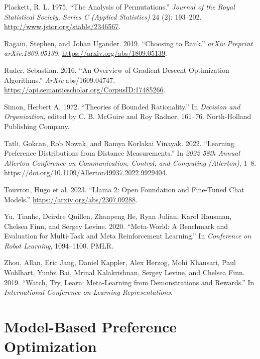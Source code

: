 \documentclass[
  letterpaper,
  numbers=noenddot,
  DIV=11]{scrreprt}
\newlength{\cslhangindent}
\newenvironment{CSLReferences}[2] %
 {\begin{list}{}{%
  \setlength{\itemindent}{0pt}
  \setlength{\leftmargin}{0pt}
  \setlength{\parsep}{0pt}
  \ifodd #1
   \setlength{\leftmargin}{\cslhangindent}
   \setlength{\itemindent}{-1\cslhangindent}
  \fi
  \setlength{\itemsep}{#2\baselineskip}}}
 {\end{list}}
\let\oldchapter\chapter
\def\chapter{%
  \setcounter{sidenote}{1}%
  \oldchapter
}
\theoremstyle{plain}
\theoremstyle{definition}
\theoremstyle{plain}
\theoremstyle{remark}
\begin{document}
\begin{CSLReferences}{1}{0}
Plackett, R. L. 1975. {``The Analysis of Permutations.''} \emph{Journal
of the Royal Statistical Society. Series C (Applied Statistics)} 24 (2):
193--202. \url{http://www.jstor.org/stable/2346567}.

Ragain, Stephen, and Johan Ugander. 2019. {``Choosing to Rank.''}
\emph{arXiv Preprint arXiv:1809.05139}.
\url{https://arxiv.org/abs/1809.05139}.

Ruder, Sebastian. 2016. {``An Overview of Gradient Descent Optimization
Algorithms.''} \emph{ArXiv} abs/1609.04747.
\url{https://api.semanticscholar.org/CorpusID:17485266}.

Simon, Herbert A. 1972. {``Theories of Bounded Rationality.''} In
\emph{Decision and Organization}, edited by C. B. McGuire and Roy
Radner, 161--76. North-Holland Publishing Company.

Tatli, Gokcan, Rob Nowak, and Ramya Korlakai Vinayak. 2022. {``Learning
Preference Distributions from Distance Measurements.''} In \emph{2022
58th Annual Allerton Conference on Communication, Control, and Computing
(Allerton)}, 1--8.
\url{https://doi.org/10.1109/Allerton49937.2022.9929404}.

Touvron, Hugo et al. 2023. {``Llama 2: Open Foundation and Fine-Tuned
Chat Models.''} \url{https://arxiv.org/abs/2307.09288}.

Yu, Tianhe, Deirdre Quillen, Zhanpeng He, Ryan Julian, Karol Hausman,
Chelsea Finn, and Sergey Levine. 2020. {``Meta-World: A Benchmark and
Evaluation for Multi-Task and Meta Reinforcement Learning.''} In
\emph{Conference on Robot Learning}, 1094--1100. PMLR.

Zhou, Allan, Eric Jang, Daniel Kappler, Alex Herzog, Mohi Khansari, Paul
Wohlhart, Yunfei Bai, Mrinal Kalakrishnan, Sergey Levine, and Chelsea
Finn. 2019. {``Watch, Try, Learn: Meta-Learning from Demonstrations and
Rewards.''} In \emph{International Conference on Learning
Representations}.

\end{CSLReferences}


\chapter{Model-Based Preference Optimization}\label{ch-model-based}
\end{document}
